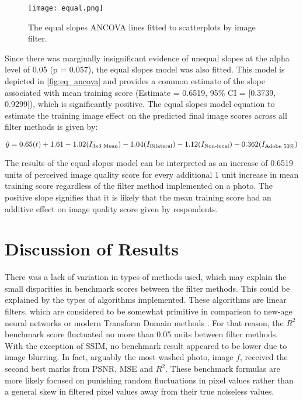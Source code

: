 \documentclass{ncjms}
\begin{document}

\begin{figure}[h]
  \centering
    \texttt{[image: equal.png]}
  \caption{The equal slopes ANCOVA lines fitted to scatterplots by image filter.}
  \label{fig:eq_ancova}
\end{figure}

Since there was marginally insignificant evidence of unequal slopes at the alpha level of 0.05 (p = 0.057), the equal slopes model was also fitted. This model is depicted in \autoref{fig:eq_ancova} and provides a common estimate of the slope associated with mean training score (Estimate = 0.6519, 95\% CI = [0.3739, 0.9299]), which is significantly positive. The equal slopes model equation to estimate the training image effect on the predicted final image scores across all filter methods is given by:

\begin{equation}
    \Hat{y}= 0.65(t) + 1.61 - 1.02(I_{\text{3x3 Mean}}) - 1.04(I_{\text{Bilateral}}) - 1.12(I_{\text{Non-local}}) - 0.362(I_{\text{Adobe 50\%}})
\end{equation}

The results of the equal slopes model can be interpreted as an increase of 0.6519 units of perceived image quality score for every additional 1 unit increase in mean training score regardless of the filter method implemented on a photo. The positive slope signifies that it is likely that the mean training score had an additive effect on image quality score given by respondents.

\section{Discussion of Results}

There was a lack of variation in types of methods used, which may explain the small disparities in benchmark scores between the filter methods. This could be explained by the types of algorithms implemented. These algorithms are linear filters, which are considered to be somewhat primitive in comparison to new-age neural networks or modern Transform Domain methods \citep{Mukesh}. For that reason, the $R^2$ benchmark score fluctuated no more than 0.05 units between filter methods. With the exception of SSIM, no benchmark result appeared to be lower due to image blurring. In fact, arguably the most washed photo, image $f$, received the second best marks from PSNR, MSE and $R^2$. These benchmark formulas are more likely focused on punishing random fluctuations in pixel values rather than a general skew in filtered pixel values away from their true noiseless values. 
\end{document}
